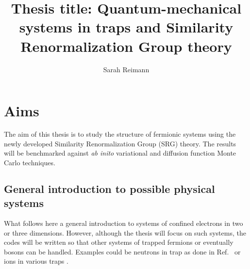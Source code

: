 \documentclass[twocolumn]{revtex4}
\begin{document}
\title{Thesis title: Quantum-mechanical systems in traps and Similarity Renormalization Group theory}
\author{Sarah Reimann}
\maketitle
\section*{Aims} 
The aim of this thesis is to study the structure of fermionic systems using the newly developed Similarity 
Renormalization Group (SRG) theory. The results will be benchmarked against  {\em ab inito} 
variational and diffusion function Monte Carlo techniques. 

\subsection*{General introduction to possible physical systems}

What follows here a general introduction to systems of confined electrons in two or three dimensions.
However, although the thesis will focus on such systems, the codes will be written so that other systems of trapped 
fermions or eventually bosons can be handled. Examples could be neutrons in trap as done in Ref.~\cite{bogner2011} or ions in various traps \cite{yoram2008}.  
\end{document}
